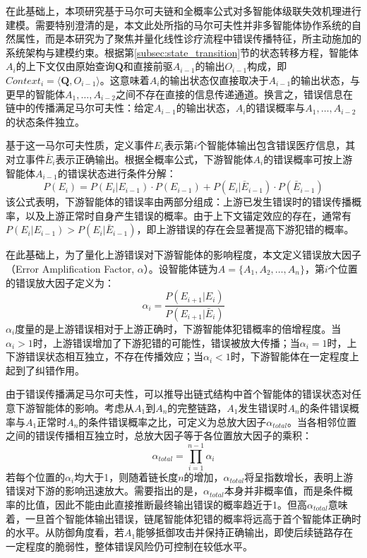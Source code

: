 在此基础上，本项研究基于马尔可夫链和全概率公式对多智能体级联失效机理进行建模。需要特别澄清的是，本文此处所指的马尔可夫性并非多智能体协作系统的自然属性，而是本研究为了聚焦并量化线性诊疗流程中错误传播特征，所主动施加的系统架构与建模约束。根据第\ref{subsec:state_transition}节的状态转移方程，智能体$A_i$的上下文仅由原始查询$\mathbf{Q}$和直接前驱$A_{i-1}$的输出$O_{i-1}$构成，即$Context_i = \langle \mathbf{Q}, O_{i-1} \rangle$。这意味着$A_i$的输出状态仅直接取决于$A_{i-1}$的输出状态，与更早的智能体$A_1, \ldots, A_{i-2}$之间不存在直接的信息传递通道。换言之，错误信息在链中的传播满足马尔可夫性：给定$A_{i-1}$的输出状态，$A_i$的错误概率与$A_1, \ldots, A_{i-2}$的状态条件独立。

基于这一马尔可夫性质，定义事件$E_i$表示第$i$个智能体输出包含错误医疗信息，其对立事件$\bar{E}_i$表示正确输出。根据全概率公式，下游智能体$A_i$的错误概率可按上游智能体$A_{i-1}$的错误状态进行条件分解：
\begin{equation}
P(E_i) = P(E_i | E_{i-1}) \cdot P(E_{i-1}) + P(E_i | \bar{E}_{i-1}) \cdot P(\bar{E}_{i-1})
\label{eq:error_propagation}
\end{equation}
该公式表明，下游智能体的错误率由两部分组成：上游已发生错误时的错误传播概率，以及上游正常时自身产生错误的概率。由于上下文锚定效应的存在，通常有$P(E_i | E_{i-1}) > P(E_i | \bar{E}_{i-1})$，即上游错误的存在会显著提高下游犯错的概率。

在此基础上，为了量化上游错误对下游智能体的影响程度，本文定义错误放大因子（Error Amplification Factor, $\alpha$）。设智能体链为$A = \{A_1, A_2, \ldots, A_n\}$，第$i$个位置的错误放大因子定义为：
\begin{equation}
\alpha_i = \frac{P(E_{i+1} | E_i)}{P(E_{i+1} | \bar{E}_i)}
\label{eq:error_amplification}
\end{equation}
$\alpha_i$度量的是上游错误相对于上游正确时，下游智能体犯错概率的倍增程度。当$\alpha_i > 1$时，上游错误增加了下游犯错的可能性，错误被放大传播；当$\alpha_i = 1$时，上下游错误状态相互独立，不存在传播效应；当$\alpha_i < 1$时，下游智能体在一定程度上起到了纠错作用。

由于错误传播满足马尔可夫性，可以推导出链式结构中首个智能体的错误状态对任意下游智能体的影响。考虑从$A_1$到$A_n$的完整链路，$A_1$发生错误时$A_n$的条件错误概率与$A_1$正常时$A_n$的条件错误概率之比，可定义为总放大因子$\alpha_{total}$。当各相邻位置之间的错误传播相互独立时，总放大因子等于各位置放大因子的乘积：
\begin{equation}
\alpha_{total} = \prod_{i=1}^{n-1} \alpha_i
\label{eq:total_amplification}
\end{equation}
若每个位置的$\alpha_i$均大于1，则随着链长度$n$的增加，$\alpha_{total}$将呈指数增长，表明上游错误对下游的影响迅速放大。需要指出的是，$\alpha_{total}$本身并非概率值，而是条件概率的比值，因此不能由此直接推断最终输出错误的概率趋近于1。但高$\alpha_{total}$意味着，一旦首个智能体输出错误，链尾智能体犯错的概率将远高于首个智能体正确时的水平。从防御角度看，若$A_1$能够抵御攻击并保持正确输出，即使后续链路存在一定程度的脆弱性，整体错误风险仍可控制在较低水平。

